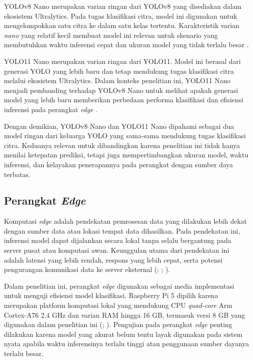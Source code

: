 \begin{sectioncontent}
\begin{subsectioncontent}
        YOLOv8 Nano merupakan varian ringan dari YOLOv8 yang disediakan dalam ekosistem Ultralytics. Pada tugas klasifikasi citra, model ini digunakan untuk mengelompokkan satu citra ke dalam satu kelas tertentu. Karakteristik varian \textit{nano} yang relatif kecil membuat model ini relevan untuk skenario yang membutuhkan waktu inferensi cepat dan ukuran model yang tidak terlalu besar \citep[bagian \textit{YOLOv8 Models}]{ultralyticsyolov8}.

        YOLO11 Nano merupakan varian ringan dari YOLO11. Model ini berasal dari generasi YOLO yang lebih baru dan tetap mendukung tugas klasifikasi citra melalui ekosistem Ultralytics. Dalam konteks penelitian ini, YOLO11 Nano menjadi pembanding terhadap YOLOv8 Nano untuk melihat apakah generasi model yang lebih baru memberikan perbedaan performa klasifikasi dan efisiensi inferensi pada perangkat \textit{edge} \citep[bagian \textit{YOLO11 Models}]{ultralyticsyolo11}.

        \newpage

        Dengan demikian, YOLOv8 Nano dan YOLO11 Nano dipahami sebagai dua model ringan dari keluarga YOLO yang sama-sama mendukung tugas klasifikasi citra. Keduanya relevan untuk dibandingkan karena penelitian ini tidak hanya menilai ketepatan prediksi, tetapi juga mempertimbangkan ukuran model, waktu inferensi, dan kelayakan penerapannya pada perangkat dengan sumber daya terbatas.
    \end{subsectioncontent}

    \subsection{Perangkat \textit{Edge}}
    \begin{subsectioncontent}
        \hspace{\parindent}Komputasi \textit{edge} adalah pendekatan pemrosesan data yang dilakukan lebih dekat dengan sumber data atau lokasi tempat data dihasilkan. Pada pendekatan ini, inferensi model dapat dijalankan secara lokal tanpa selalu bergantung pada server pusat atau komputasi awan. Keunggulan utama dari pendekatan ini adalah latensi yang lebih rendah, respons yang lebih cepat, serta potensi pengurangan komunikasi data ke server eksternal (\citealp[hlm. 71--74]{singh2023edge}; \citealp[hlm. 1--4]{gill2025taxonomy}; \citealp[hlm. 1--6]{xu2025edge}).

        Dalam penelitian ini, perangkat \textit{edge} digunakan sebagai media implementasi untuk menguji efisiensi model klasifikasi. Raspberry Pi 5 dipilih karena merupakan platform komputasi lokal yang mendukung CPU \textit{quad-core} Arm Cortex-A76 2.4 GHz dan varian RAM hingga 16 GB, termasuk versi 8 GB yang digunakan dalam penelitian ini (\citealp[bagian \textit{Specifications}]{raspberrypi5}; \citealp[hlm. 2--3]{raspberrypi5brief}). Pengujian pada perangkat \textit{edge} penting dilakukan karena model yang akurat belum tentu layak digunakan pada sistem nyata apabila waktu inferensinya terlalu tinggi atau penggunaan sumber dayanya terlalu besar.
    \end{subsectioncontent}


\end{sectioncontent}
